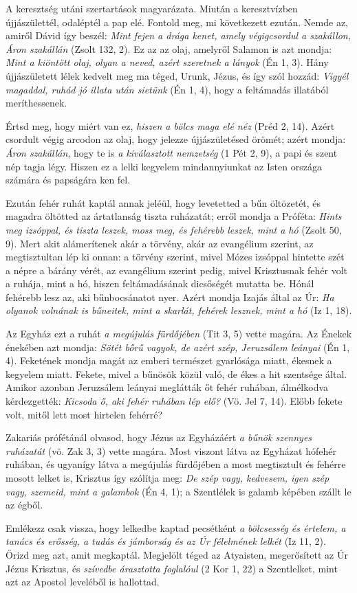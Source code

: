 \documentclass[twoside]{article}
\begin{document}
\begin{lectio}{A keresztség utáni szertartások magyarázata.}
\noindent Miután a keresztvízben újjászülettél, odaléptél a pap elé. Fontold meg, mi következett ezután. Nemde az, amiről Dávid így beszél: \textit{Mint fejen a drága kenet, amely végigcsordul a szakállon, Áron szakállán} (Zsolt 132, 2). Ez az az olaj, amelyről Salamon is azt mondja: \textit{Mint a kiöntött olaj, olyan a neved, azért szeretnek a lányok} (Én 1, 3). Hány újjászületett lélek kedvelt meg ma téged, Urunk, Jézus, és így szól hozzád: \textit{Vigyél magaddal, ruhád jó illata után sietünk} (Én 1, 4), hogy a feltámadás illatából meríthessenek.

Értsd meg, hogy miért van ez, \textit{hiszen a bölcs maga elé néz} (Préd 2, 14). Azért csordult végig arcodon az olaj, hogy jelezze újjászületésed örömét; azért mondja: \textit{Áron szakállán}, hogy te is \textit{a kiválasztott nemzetség} (1 Pét 2, 9), a papi és szent nép tagja légy. Hiszen ez a lelki kegyelem mindannyiunkat az Isten országa számára és papságára ken fel.

Ezután fehér ruhát kaptál annak jeléül, hogy levetetted a bűn öltözetét, és magadra öltötted az ártatlanság tiszta ruházatát; erről mondja a Próféta: \textit{Hints meg izsóppal, és tiszta leszek, moss meg, és fehérebb leszek, mint a hó} (Zsolt 50, 9). Mert akit alámerítenek akár a törvény, akár az evangélium szerint, az megtisztultan lép ki onnan: a törvény szerint, mivel Mózes izsóppal hintette szét a népre a bárány vérét, az evangélium szerint pedig, mivel Krisztusnak fehér volt a ruhája, mint a hó, hiszen feltámadásának dicsőségét mutatta be. Hónál fehérebb lesz az, aki bűnbocsánatot nyer. Azért mondja Izajás által az Úr: \textit{Ha olyanok volnának is bűneitek, mint a skarlát, fehérek lesznek, mint a hó} (Iz 1, 18).

Az Egyház ezt a ruhát \textit{a megújulás fürdőjében} (Tit 3, 5) vette magára. Az Énekek énekében azt mondja: \textit{Sötét bőrű vagyok, de azért szép, Jeruzsálem leányai} (Én 1, 4). Feketének mondja magát az emberi természet gyarlósága miatt, ékesnek a kegyelem miatt. Fekete, mivel a bűnösök közül való, de ékes a hit szentsége által. Amikor azonban Jeruzsálem leányai meglátták őt fehér ruhában, álmélkodva kérdezgették: \textit{Kicsoda ő, aki fehér ruhában lép elő?} (Vö. Jel 7, 14). Előbb fekete volt, mitől lett most hirtelen fehérré?

Zakariás prófétánál olvasod, hogy Jézus az Egyházáért \textit{a bűnök szennyes ruházatát} (vö. Zak 3, 3) vette magára. Most viszont látva az Egyházat hófehér ruhában, és ugyanígy látva a megújulás fürdőjében a most megtisztult és fehérre mosott lelket is, Krisztus így szólítja meg: \textit{De szép vagy, kedvesem, igen szép vagy, szemeid, mint a galambok} (Én 4, 1); a Szentlélek is galamb képében szállt le az égből.

Emlékezz csak vissza, hogy lelkedbe kaptad pecsétként \textit{a bölcsesség és értelem, a tanács és erősség, a tudás és jámborság és az Úr félelmének lelkét} (Iz 11, 2). Őrizd meg azt, amit megkaptál. Megjelölt téged az Atyaisten, megerősített az Úr Jézus Krisztus, és \textit{szívedbe árasztotta foglalóul} (2 Kor 1, 22) a Szentlelket, mint azt az Apostol leveléből is hallottad.
\end{lectio}
\end{document}
